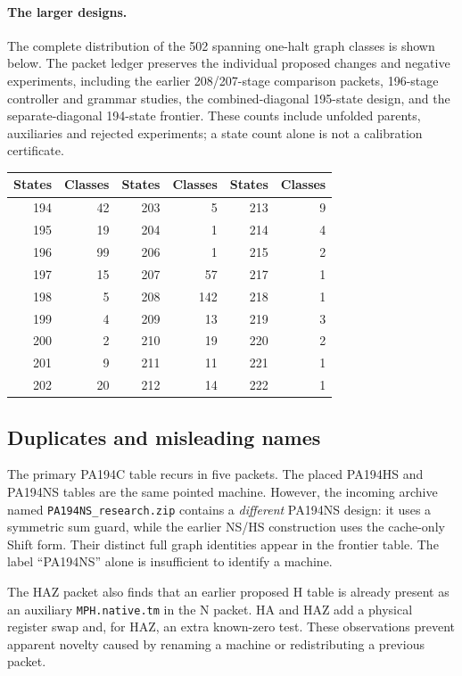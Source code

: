 \documentclass[11pt,letterpaper]{article}
\newcommand{\file}[1]{\texttt{\nolinkurl{#1}}}
\begin{document}
\paragraph{The larger designs.}
The complete distribution of the 502 spanning one-halt graph classes is
shown below. The packet ledger preserves the individual proposed changes
and negative experiments, including the earlier 208/207-stage comparison
packets, 196-stage controller and grammar studies, the combined-diagonal
195-state design, and the separate-diagonal 194-state frontier. These counts
include unfolded parents, auxiliaries and rejected experiments; a state
count alone is not a calibration certificate.
\begin{center}\small
\begin{tabular}{@{}rr@{\qquad}rr@{\qquad}rr@{}}
\toprule States&Classes&States&Classes&States&Classes\\\midrule
194&42&203&5&213&9\\
195&19&204&1&214&4\\
196&99&206&1&215&2\\
197&15&207&57&217&1\\
198&5&208&142&218&1\\
199&4&209&13&219&3\\
200&2&210&19&220&2\\
201&9&211&11&221&1\\
202&20&212&14&222&1\\
\bottomrule
\end{tabular}
\end{center}

\subsection{Duplicates and misleading names}

The primary PA194C table recurs in five packets. The placed PA194HS and
PA194NS tables are the same pointed machine. However, the incoming archive
named \file{PA194NS_research.zip} contains a \emph{different} PA194NS design:
it uses a symmetric sum guard, while the earlier NS/HS construction uses the
cache-only Shift form. Their distinct full graph identities appear in the
frontier table. The label ``PA194NS'' alone is insufficient to identify a
machine.

The HAZ packet also finds that an earlier proposed H table is already present
as an auxiliary \file{MPH.native.tm} in the N packet. HA and HAZ add a physical
register swap and, for HAZ, an extra known-zero test. These observations
prevent apparent novelty caused by renaming a machine or redistributing a
previous packet.
\end{document}
